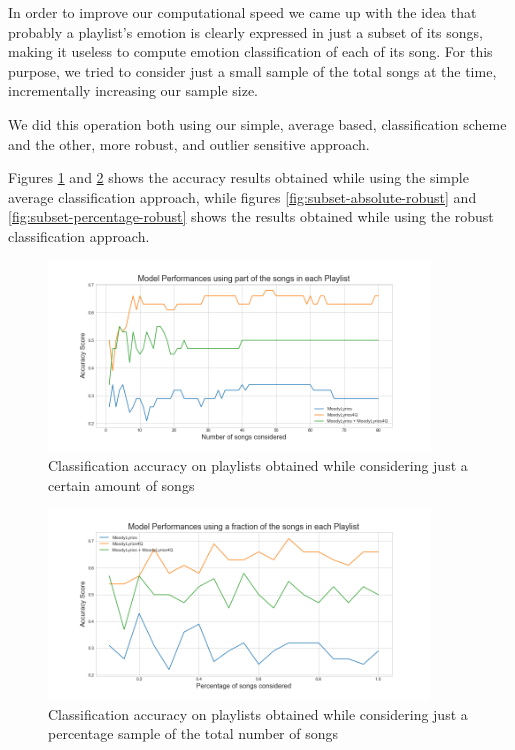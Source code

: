 In order to improve our computational speed we came up with the idea that probably a playlist's emotion is clearly expressed in just a subset of its songs, making it useless to compute emotion classification of each of its song. For this purpose, we tried to consider just a small sample of the total songs at the time, incrementally increasing our sample size.

We did this operation both using our simple, average based, classification scheme and the other, more robust, and outlier sensitive approach.

Figures \ref{fig:subset-absolute} and \ref{fig:subset-percentage} shows the accuracy results obtained while using the simple average classification approach, while figures \ref{fig:subset-absolute-robust} and \ref{fig:subset-percentage-robust} shows the results obtained while using the robust classification approach.

\begin{figure}[H]
\centering
\includegraphics[width=0.9\textwidth]{./chapters/chapter5/images/subset-absolute}
\caption{Classification accuracy on playlists obtained while considering just a certain amount of songs}
\label{fig:subset-absolute}
\end{figure}

\begin{figure}[H]
\centering
\includegraphics[width=0.9\textwidth]{./chapters/chapter5/images/subset-percentage}
\caption{Classification accuracy on playlists obtained while considering just a percentage sample of the total number of songs}
\label{fig:subset-percentage}
\end{figure}

